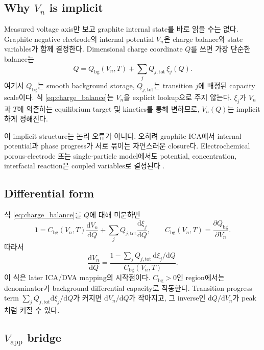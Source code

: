\documentclass[11pt]{article}
\newcommand{\dd}{\mathrm{d}}
\newcommand{\app}{\mathrm{app}}
\newcommand{\bg}{\mathrm{bg}}
\newcommand{\tot}{\mathrm{tot}}
\begin{document}
\subsection{Why \(V_n\) is implicit}\label{subsec:implicit}

Measured voltage axis만 보고 graphite internal state를 바로 읽을 수는 없다. Graphite negative
electrode의 internal potential \(V_n\)은 charge balance와 state variables가 함께 결정한다.
Dimensional charge coordinate \(Q\)를 쓰면 가장 단순한 balance는
\begin{equation}
\boxed{
Q
=
Q_{\bg}(V_n,T)
+
\sum_j Q_{j,\tot}\,\xi_j(Q).
}
\label{eq:charge_balance}
\end{equation}
여기서 \(Q_{\bg}\)는 smooth background storage, \(Q_{j,\tot}\)는 transition \(j\)에 배정된
capacity scale이다. 식 \eqref{eq:charge_balance}는 \(V_n\)을 explicit lookup으로 주지 않는다.
\(\xi_j\)가 \(V_n\)과 \(T\)에 의존하는 equilibrium target 및 kinetics를 통해 변하므로,
\(V_n(Q)\)는 implicit하게 정해진다.

이 implicit structure는 논리 오류가 아니다. 오히려 graphite ICA에서 internal potential과 phase
progress가 서로 묶이는 자연스러운 closure다. Electrochemical porous-electrode 또는 single-particle
model에서도 potential, concentration, interfacial reaction은 coupled variables로 결정된다
\cite{dfn1993,newman}.

\subsection{Differential form}\label{subsec:charge_diff}

식 \eqref{eq:charge_balance}를 \(Q\)에 대해 미분하면
\begin{equation}
1
=
C_{\bg}(V_n,T)\frac{\dd V_n}{\dd Q}
+
\sum_j Q_{j,\tot}\frac{\dd \xi_j}{\dd Q},
\qquad
C_{\bg}(V_n,T)=\frac{\partial Q_{\bg}}{\partial V_n}.
\label{eq:charge_diff}
\end{equation}
따라서
\begin{equation}
\frac{\dd V_n}{\dd Q}
=
\frac{
1-\sum_j Q_{j,\tot}\,\dd\xi_j/\dd Q
}{
C_{\bg}(V_n,T)
}.
\label{eq:dvn_dq}
\end{equation}
이 식은 later ICA/DVA mapping의 시작점이다. \(C_{\bg}>0\)인 region에서는 denominator가
background differential capacity로 작동한다. Transition progress term
\(\sum_j Q_{j,\tot}\dd\xi_j/\dd Q\)가 커지면 \(\dd V_n/\dd Q\)가 작아지고, 그 inverse인
\(\dd Q/\dd V_n\)가 peak처럼 커질 수 있다.

\subsection{\(V_{\app}\) bridge}\label{subsec:vapp_bridge}
\end{document}
